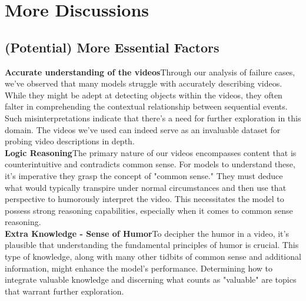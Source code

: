 \section{More Discussions}
\subsection{(Potential) More Essential Factors}
\noindent\textbf{Accurate understanding of the videos}\quad Through our analysis of failure cases, we've observed that many models struggle with accurately describing videos. While they might be adept at detecting objects within the videos, they often falter in comprehending the contextual relationship between sequential events. Such misinterpretations indicate that there's a need for further exploration in this domain. The videos we've used can indeed serve as an invaluable dataset for probing video descriptions in depth.\\
\noindent\textbf{Logic Reasoning}\quad The primary nature of our videos encompasses content that is counterintuitive and contradicts common sense. For models to understand these, it's imperative they grasp the concept of "common sense." They must deduce what would typically transpire under normal circumstances and then use that perspective to humorously interpret the video. This necessitates the model to possess strong reasoning capabilities, especially when it comes to common sense reasoning.\\
\noindent\textbf{Extra Knowledge - Sense of Humor}\quad To decipher the humor in a video, it's plausible that understanding the fundamental principles of humor is crucial. This type of knowledge, along with many other tidbits of common sense and additional information, might enhance the model's performance. Determining how to integrate valuable knowledge and discerning what counts as "valuable" are topics that warrant further exploration.


